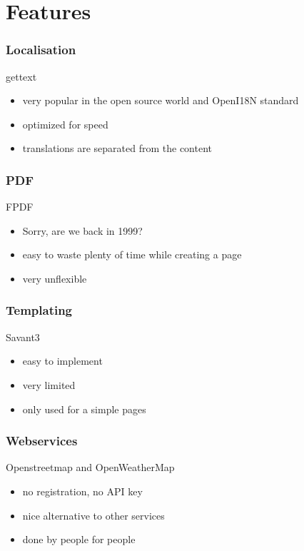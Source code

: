 \section{Features}
%
\begin{frame}
\frametitle{Localisation}
%
\begin{center}
{\Large gettext}
\end{center}
\vspace{1cm}
%
\begin{itemize}
  \item very popular in the open source world and OpenI18N standard
  \item optimized for speed
  \item translations are separated from the content
\end{itemize}
\end{frame}
%
\begin{frame}
\frametitle{PDF}
%
\begin{center}
{\Large FPDF}
\end{center}
\vspace{1cm}
%
\begin{itemize}
  \item Sorry, are we back in 1999?
  \item easy to waste plenty of time while creating a page
  \item very unflexible
  \end{itemize}
\end{frame}
%
\begin{frame}
\frametitle{Templating}
%
\begin{center}
{\Large Savant3}
\end{center}
\vspace{1cm}
\begin{itemize}
  \item easy to implement
  \item very limited
  \item only used for a simple pages
  \end{itemize}
\end{frame}
%
\begin{frame}
\frametitle{Webservices}
%
\begin{center}
{\Large Openstreetmap and OpenWeatherMap}
\end{center}
\vspace{1cm}
%
\begin{itemize}
  \item no registration, no API key
  \item nice alternative to other services
  \item done by people for people
  \end{itemize}
\end{frame}
